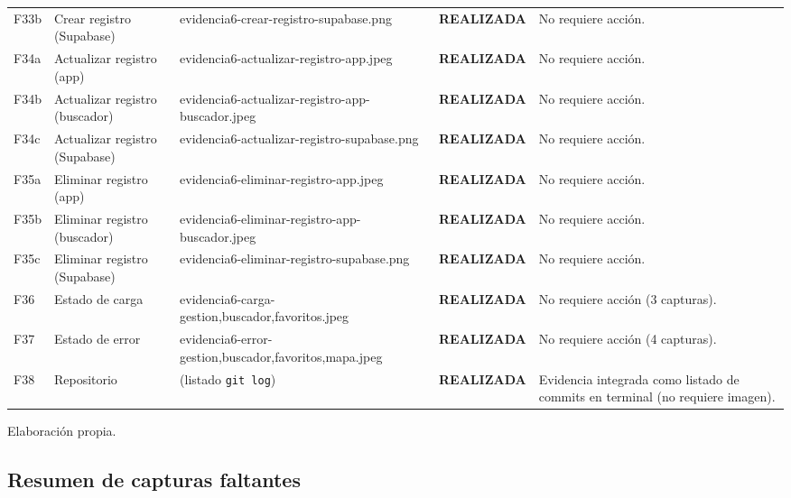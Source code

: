 \begin{table}[H]
{\begin{tablaAPA}
\begin{tabular}{@{}p{0.8cm}p{3.2cm}>{\footnotesize}p{6.0cm}p{1.8cm}p{2.4cm}@{}}
        \addlinespace
        F33b & Crear registro (Supabase) & evidencia6-crear-registro-supabase.png &
        \textbf{REALIZADA} & No requiere acci\'on. \\
        \addlinespace
        F34a & Actualizar registro (app) & evidencia6-actualizar-registro-app.jpeg &
        \textbf{REALIZADA} & No requiere acci\'on. \\
        \addlinespace
        F34b & Actualizar registro (buscador) & evidencia6-actualizar-registro-app-buscador.jpeg &
        \textbf{REALIZADA} & No requiere acci\'on. \\
        \addlinespace
        F34c & Actualizar registro (Supabase) & evidencia6-actualizar-registro-supabase.png &
        \textbf{REALIZADA} & No requiere acci\'on. \\
        \addlinespace
        F35a & Eliminar registro (app) & evidencia6-eliminar-registro-app.jpeg &
        \textbf{REALIZADA} & No requiere acci\'on. \\
        \addlinespace
        F35b & Eliminar registro (buscador) & evidencia6-eliminar-registro-app-buscador.jpeg &
        \textbf{REALIZADA} & No requiere acci\'on. \\
        \addlinespace
        F35c & Eliminar registro (Supabase) & evidencia6-eliminar-registro-supabase.png &
        \textbf{REALIZADA} & No requiere acci\'on. \\
        \addlinespace
        F36 & Estado de carga & evidencia6-carga-{gestion,buscador,favoritos}.jpeg &
        \textbf{REALIZADA} & No requiere acci\'on (3 capturas). \\
        \addlinespace
        F37 & Estado de error & evidencia6-error-{gestion,buscador,favoritos,mapa}.jpeg &
        \textbf{REALIZADA} & No requiere acci\'on (4 capturas). \\
        \addlinespace
        F38 & Repositorio & (listado \texttt{git log}) &
        \textbf{REALIZADA} & Evidencia integrada como listado de commits
        en terminal (no requiere imagen). \\
        \bottomrule
      \end{tabular}
    \end{tablaAPA}%
  }{Elaboraci\'on propia.}
\end{table}

\subsection*{Resumen de capturas faltantes}

